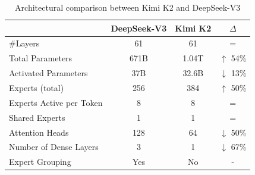 \begin{table}[htbp]
\centering
\caption{Architectural comparison between Kimi K2 and DeepSeek-V3}
\label{tab:k2_arch_comparison}
\begin{tabular}{lccc}
\toprule
  & \textbf{DeepSeek-V3} & \textbf{Kimi K2} & \textbf{$\Delta$} \\
\midrule
\#Layers & 61 & 61 & = \\
Total Parameters & 671B & 1.04T & $\uparrow$ 54\% \\
Activated Parameters & 37B & 32.6B & $\downarrow$ 13\% \\
Experts (total) & 256 & 384 & $\uparrow$ 50\% \\
Experts Active per Token & 8 & 8 & = \\
Shared Experts & 1 & 1 & = \\
Attention Heads & 128 & 64 & $\downarrow$ 50\% \\
Number of Dense Layers & 3 & 1 & $\downarrow$ 67\% \\
Expert Grouping & Yes & No  & - \\
\bottomrule
\end{tabular}
\end{table}